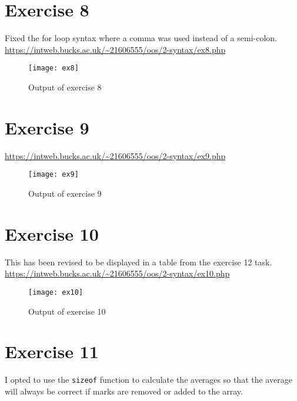 \clearpage
\section{Exercise 8}

Fixed the for loop syntax where a comma was used instead of a semi-colon.\\

\url{https://intweb.bucks.ac.uk/~21606555/oos/2-syntax/ex8.php}
\captionsetup{type=figure}


\begin{figure}[H]
  \caption{Output of exercise 8}
  \centering
  \texttt{[image: ex8]}
\end{figure}

\clearpage
\section{Exercise 9}

\url{https://intweb.bucks.ac.uk/~21606555/oos/2-syntax/ex9.php}
\captionsetup{type=figure}


\begin{figure}[H]
  \caption{Output of exercise 9}
  \centering
  \texttt{[image: ex9]}
\end{figure}

\clearpage
\section{Exercise 10}

This has been revised to be displayed in a table from the exercise 12 task.\\

\url{https://intweb.bucks.ac.uk/~21606555/oos/2-syntax/ex10.php}
\captionsetup{type=figure}


\begin{figure}[H]
  \caption{Output of exercise 10}
  \centering
  \texttt{[image: ex10]}
\end{figure}

\section{Exercise 11}

I opted to use the \texttt{sizeof} function to calculate the averages so that the average will always be correct if marks are removed or added to the array.\\

